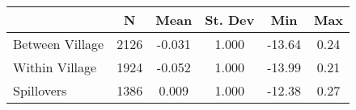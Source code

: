 \begin{tabular}{l*{5}{c}}\hline&\multicolumn{1}{c}{N}&\multicolumn{1}{c}{Mean}&\multicolumn{1}{c}{St. Dev}&\multicolumn{1}{c}{Min}&\multicolumn{1}{c}{Max}\\ \hline 
Between Village & 2126 & -0.031 & 1.000 & -13.64 & 0.24 \\
Within Village & 1924 & -0.052 & 1.000 & -13.99 & 0.21 \\
Spillovers & 1386 & 0.009 & 1.000 & -12.38 & 0.27 \\
\hline \end{tabular}
